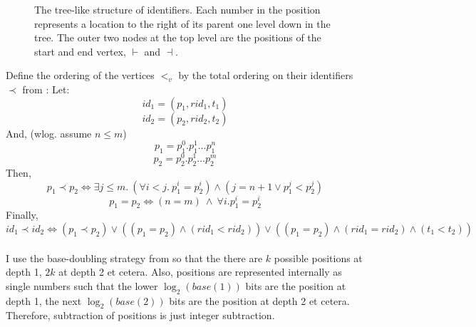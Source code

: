\documentclass[diss.tex]{subfiles}
\begin{document}
\begin{figure}[H]
\centering
{}
\caption{The tree-like structure of identifiers. Each number in the position represents a location to the right of its parent one level down in the tree. The outer two nodes at the top level are the positions of the start and end vertex, $\vdash$ and $\dashv$.}
\label{fig:tree}
\end{figure}
%
%
%
%
Define the ordering of the vertices $<_v$ by the total ordering on their identifiers $\prec$ from \cite{logoot}: 
Let: $$id_1 = (p_1, rid_1, t_1)$$ $$id_2 = (p_2, rid_2, t_2)$$
And, (wlog. assume $n \leq m$)
$$ p_1 = p_1^0.p_1^1...p_1^n$$ $$p_2 = p_2^0.p_2^1...p_2^m$$
Then, 
$$ p_1 \prec p_2 \Leftrightarrow \exists j \leq m.~ (\forall i<j.~ p_1^i = p_2^i) \wedge (j=n+1 \vee p_1^j < p_2^j)$$
$$ p_1 = p_2 \Leftrightarrow (n=m)~ \wedge~ \forall i. p_1^i = p_2^i$$
Finally, $$id_1 \prec id_2 \Leftrightarrow (p_1 \prec p_2) \vee ((p_1 = p_2) \wedge (rid_1 < rid_2)) \vee ((p_1 = p_2) \wedge (rid_1 = rid_2) \wedge (t_1 < t_2))$$
\\
I use the base-doubling strategy from \cite{logoot} so that the there are $k$ possible positions at depth 1, $2k$ at depth 2 et cetera. Also, positions are represented internally as single numbers such that the lower $\log_2(base(1))$ bits are the position at depth 1, the next $\log_2(base(2))$ bits are the position at depth 2 et cetera. Therefore, subtraction of positions is just integer subtraction.
\\\\
\end{document}
